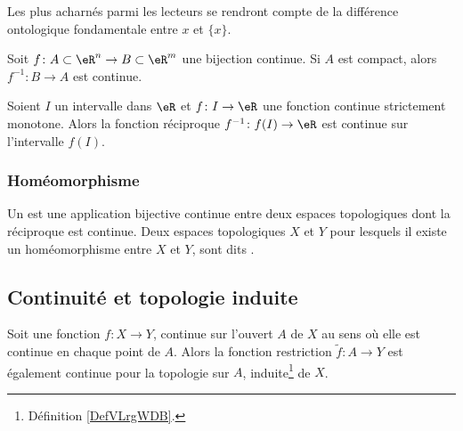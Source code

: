 Les plus acharnés parmi les lecteurs se rendront compte de la différence ontologique fondamentale entre \( x\) et \( \{ x \}\).

\begin{proposition}	\label{PropoInvCompCont}
Soit $f\colon A\subset\eR^n\to B\subset\eR^m$ une bijection continue. Si $A$ est compact, alors $f^{-1}\colon B\to A$ est continue.
\end{proposition}

\begin{proposition}		\label{PropIntContMOnIvCont}
Soient $I$ un intervalle dans $\eR$ et $f\colon I\to \eR$ une fonction continue strictement monotone. Alors la fonction réciproque $f^{-1}\colon f(I)\to \eR$ est continue sur l'intervalle $f(I)$.
\end{proposition}

\subsubsection{Homéomorphisme}

\begin{definition}
    Un  est une application bijective continue entre deux espaces topologiques dont la réciproque est continue. Deux espaces topologiques $X$ et $Y$ pour lesquels il existe un homéomorphisme entre $X$ et $Y$, sont dits .
\end{definition}

\subsection{Continuité et topologie induite}
\begin{proposition}     \label{PROPooNPLBooPfmmym}
    Soit une fonction \( f\colon X\to Y\), continue sur l'ouvert \( A\) de \( X\) au sens où elle est continue en chaque point de \( A\). Alors la fonction restriction \( \tilde f\colon A\to Y\) est également continue pour la topologie sur \( A\), induite\footnote{Définition \ref{DefVLrgWDB}.} de \( X\).
\end{proposition}

